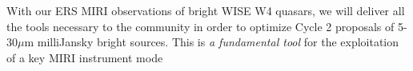 \documentclass[12pt]{article}
\begin{document}
\clearpage

%
%
\rationaletime          %

With our ERS MIRI observations of bright WISE W4 quasars, we will deliver all the tools necessary to the community in order to optimize Cycle 2 proposals of 5-30$\mu$m milliJansky bright sources. This is {\it a fundamental tool} for the exploitation of a key MIRI instrument mode


\clearpage

%
%
\justification          %




\clearpage

%
%
\describeobservations   %



%
%
\alttargets   %


%
%
\specialreq             %


%
%
\coordinatedobs %
\end{document}
